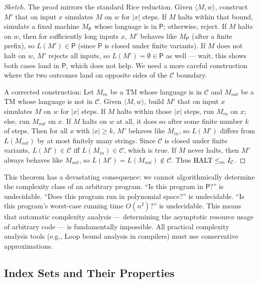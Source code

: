 \begin{proof}[Sketch]
The proof mirrors the standard Rice reduction. Given $\langle M, w \rangle$, construct $M'$ that on input $x$ simulates $M$ on $w$ for $|x|$ steps. If $M$ halts within that bound, simulate a fixed machine $M_{\mathsf{P}}$ whose language is in $\mathsf{P}$; otherwise, reject. If $M$ halts on $w$, then for sufficiently long inputs $x$, $M'$ behaves like $M_{\mathsf{P}}$ (after a finite prefix), so $L(M') \in \mathsf{P}$ (since $\mathsf{P}$ is closed under finite variants). If $M$ does not halt on $w$, $M'$ rejects all inputs, so $L(M') = \emptyset \in \mathsf{P}$ as well --- wait, this shows both cases land in $\mathsf{P}$, which does not help. We need a more careful construction where the two outcomes land on opposite sides of the $\mathcal{C}$ boundary.

A corrected construction: Let $M_{in}$ be a TM whose language is in $\mathcal{C}$ and $M_{out}$ be a TM whose language is not in $\mathcal{C}$. Given $\langle M, w \rangle$, build $M'$ that on input $x$ simulates $M$ on $w$ for $|x|$ steps. If $M$ halts within those $|x|$ steps, run $M_{in}$ on $x$; else, run $M_{out}$ on $x$. If $M$ halts on $w$ at all, it does so after some finite number $k$ of steps. Then for all $x$ with $|x| \geq k$, $M'$ behaves like $M_{in}$, so $L(M')$ differs from $L(M_{out})$ by at most finitely many strings. Since $\mathcal{C}$ is closed under finite variants, $L(M') \in \mathcal{C}$ iff $L(M_{in}) \in \mathcal{C}$, which is true. If $M$ never halts, then $M'$ always behaves like $M_{out}$, so $L(M') = L(M_{out}) \notin \mathcal{C}$. Thus $\text{HALT} \leq_m I_\mathcal{C}$.
\end{proof}

This theorem has a devastating consequence: we cannot algorithmically determine the complexity class of an arbitrary program. ``Is this program in $\mathsf{P}$?'' is undecidable. ``Does this program run in polynomial space?'' is undecidable. ``Is this program's worst-case running time $O(n^2)$?'' is undecidable. This means that automatic complexity analysis --- determining the asymptotic resource usage of arbitrary code --- is fundamentally impossible. All practical complexity analysis tools (e.g., Loop bound analysis in compilers) must use conservative approximations.

\subsection{Index Sets and Their Properties}
\label{sec:rice:indexsets}

